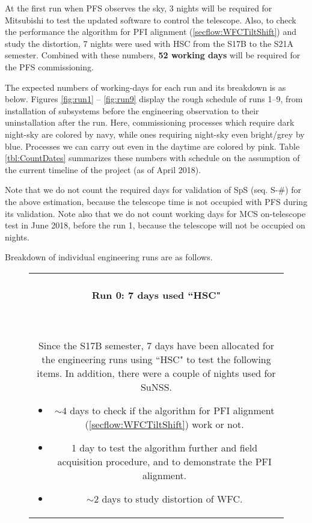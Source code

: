 At the first run when PFS observes the sky, 3 nights will be required for Mitsubishi to test the updated software to control the telescope.
Also, to check the performance the algorithm for PFI alignment (\ref{secflow:WFCTiltShift}) and study the distortion, 7 nights were used with HSC from the S17B to the S21A semester.
Combined with these numbers, {\bf 52 working days} will be required for the PFS commissioning.

The expected numbers of working-days for each run and its breakdown is as below.
Figures \ref{fig:run1} -- \ref{fig:run9}  display the rough schedule of runs 1--9, from installation of subsystems before the engineering observation to their uninstallation after the run.
Here, commissioning processes which require dark night-sky are colored by navy, while ones requiring night-sky even bright/grey by blue.
Processes we can carry out even in the daytime are colored by pink.
Table \ref{tbl:CountDates} summarizes these numbers with schedule on the assumption of the current timeline of the project (as of April 2018).

Note that we do not count the required days for validation of SpS (seq. S-\#) for the above estimation, because the telescope time is not occupied with PFS during its validation.
Note also that we do not count working days for MCS on-telescope test in June 2018, before the run 1, because the telescope will not be occupied on nights. 

\bigskip

Breakdown of individual engineering runs are as follows.

\begin{figure}[!ht]
\begin{center}
\begin{tabular}{c}
\begin{minipage}{0.95\hsize}
\paragraph{Run 0: 7 days used ``HSC"} \, 

Since the S17B semester, 7 days have been allocated for the engineering runs using ``HSC" to test the following items.
In addition, there were a couple of nights used for SuNSS.
	\begin{itemize}
	\item $\sim 4$ days to check if the algorithm for PFI alignment (\ref{secflow:WFCTiltShift}) work or not.
	\item 1 day to test the algorithm further and field acquisition procedure, and to demonstrate the PFI alignment.
	\item $\sim 2$ days to study distortion of WFC.
	\end{itemize}
\end{minipage}
\end{tabular}
\end{center}
\end{figure}

